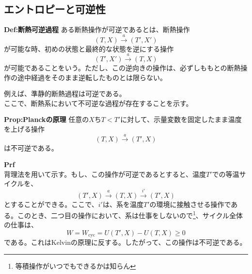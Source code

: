 \documentclass[a4paper,11pt]{jsarticle}
\numberwithin{equation}{section}
\begin{document}
\subsection{エントロピーと可逆性}
\begin{itembox}[l]{\textbf{Def:断熱可逆過程}}
    ある断熱操作が可逆であるとは、断熱操作
    \begin{equation}
        (T,X) \xrightarrow{a} (T',X')
    \end{equation}
    が可能な時、初めの状態と最終的な状態を逆にする操作
    \begin{equation}
        (T',X') \xrightarrow{a} (T,X)
    \end{equation}
    が可能であることをいう。ただし、この逆向きの操作は、必ずしももとの断熱操作の途中経過をそのまま逆転したものとは限らない。
\end{itembox}
例えば、準静的断熱過程は可逆である。\\
ここで、断熱系において不可逆な過程が存在することを示す。\\
\begin{itembox}[l]{\textbf{Prop:Planckの原理}}
    任意の$X$ち$T<T'$に対して、示量変数を固定したまま温度を上げる操作
    \begin{equation}
        (T,X) \xrightarrow{a} (T',X)
    \end{equation}
    は不可逆である。
\end{itembox}
\textbf{Prf}\\
背理法を用いて示す。もし、この操作が可逆であるとすると、温度$T'$での等温サイクルを、
\begin{equation}
    (T',X) \xrightarrow{a} (T,X) \xrightarrow{i'} (T',X)
\end{equation}
とすることができる。ここで、$i'$は、系を温度$T'$の環境に接触させる操作である。このとき、二つ目の操作において、系は仕事をしないので\footnote{等積操作がいつでもできるかは知らん}、サイクル全体の仕事は、
\begin{equation}
    W = W_{\text{cyc}} = U(T',X) - U(T,X) \geq 0
\end{equation}
である。これはKelvinの原理に反する。したがって、この操作は不可逆である。\\
\end{document}

